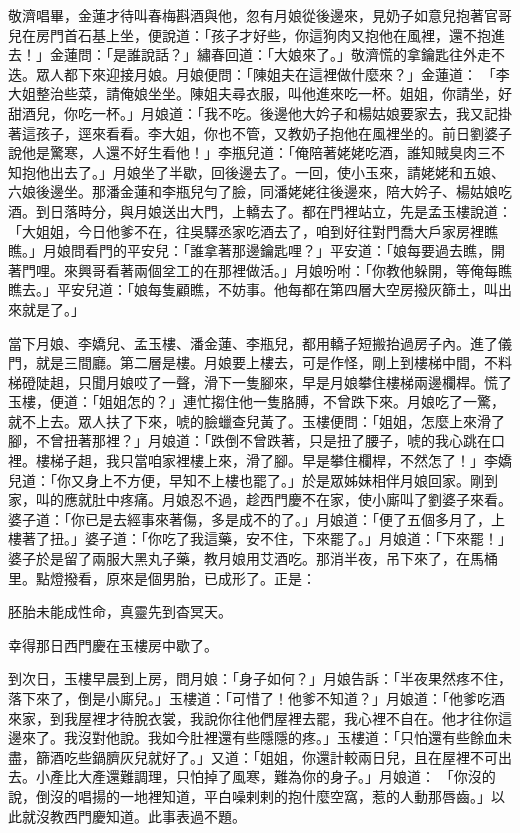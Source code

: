 \begin{showcontents}{}
敬濟唱畢，金蓮才待叫春梅斟酒與他，忽有月娘從後邊來，見奶子如意兒抱著官哥兒在房門首石基上坐，便說道：「孩子才好些，你這狗肉又抱他在風裡，還不抱進去！」金蓮問：「是誰說話？」繡春回道：「大娘來了。」敬濟慌的拿鑰匙往外走不迭。眾人都下來迎接月娘。月娘便問：「陳姐夫在這裡做什麼來？」金蓮道： 「李大姐整治些菜，請俺娘坐坐。陳姐夫尋衣服，叫他進來吃一杯。姐姐，你請坐，好甜酒兒，你吃一杯。」月娘道：「我不吃。後邊他大妗子和楊姑娘要家去，我又記掛著這孩子，逕來看看。李大姐，你也不管，又教奶子抱他在風裡坐的。前日劉婆子說他是驚寒，人還不好生看他！」李瓶兒道：「俺陪著姥姥吃酒，誰知賊臭肉三不知抱他出去了。」月娘坐了半歇，回後邊去了。一回，使小玉來，請姥姥和五娘、六娘後邊坐。那潘金蓮和李瓶兒勻了臉，同潘姥姥往後邊來，陪大妗子、楊姑娘吃酒。到日落時分，與月娘送出大門，上轎去了。都在門裡站立，先是孟玉樓說道：「大姐姐，今日他爹不在，往吳驛丞家吃酒去了，咱到好往對門喬大戶家房裡瞧瞧。」月娘問看門的平安兒：「誰拿著那邊鑰匙哩？」平安道：「娘每要過去瞧，開著門哩。來興哥看著兩個坌工的在那裡做活。」月娘吩咐：「你教他躲開，等俺每瞧瞧去。」平安兒道：「娘每隻顧瞧，不妨事。他每都在第四層大空房撥灰篩土，叫出來就是了。」

當下月娘、李嬌兒、孟玉樓、潘金蓮、李瓶兒，都用轎子短搬抬過房子內。進了儀門，就是三間廳。第二層是樓。月娘要上樓去，可是作怪，剛上到樓梯中間，不料梯磴陡趄，只聞月娘哎了一聲，滑下一隻腳來，早是月娘攀住樓梯兩邊欄桿。慌了玉樓，便道：「姐姐怎的？」連忙搊住他一隻胳膊，不曾跌下來。月娘吃了一驚，就不上去。眾人扶了下來，唬的臉蠟查兒黃了。玉樓便問：「姐姐，怎麼上來滑了腳，不曾扭著那裡？」月娘道：「跌倒不曾跌著，只是扭了腰子，唬的我心跳在口裡。樓梯子趄，我只當咱家裡樓上來，滑了腳。早是攀住欄桿，不然怎了！」李嬌兒道：「你又身上不方便，早知不上樓也罷了。」於是眾姊妹相伴月娘回家。剛到家，叫的應就肚中疼痛。月娘忍不過，趁西門慶不在家，使小廝叫了劉婆子來看。婆子道：「你已是去經事來著傷，多是成不的了。」月娘道：「便了五個多月了，上樓著了扭。」婆子道：「你吃了我這藥，安不住，下來罷了。」月娘道：「下來罷！」婆子於是留了兩服大黑丸子藥，教月娘用艾酒吃。那消半夜，吊下來了，在馬桶里。點燈撥看，原來是個男胎，已成形了。正是：

胚胎未能成性命，真靈先到杳冥天。

幸得那日西門慶在玉樓房中歇了。

到次日，玉樓早晨到上房，問月娘：「身子如何？」月娘告訴：「半夜果然疼不住，落下來了，倒是小廝兒。」玉樓道：「可惜了！他爹不知道？」月娘道：「他爹吃酒來家，到我屋裡才待脫衣裳，我說你往他們屋裡去罷，我心裡不自在。他才往你這邊來了。我沒對他說。我如今肚裡還有些隱隱的疼。」玉樓道：「只怕還有些餘血未盡，篩酒吃些鍋臍灰兒就好了。」又道：「姐姐，你還計較兩日兒，且在屋裡不可出去。小產比大產還難調理，只怕掉了風寒，難為你的身子。」月娘道： 「你沒的說，倒沒的唱揚的一地裡知道，平白噪剌剌的抱什麼空窩，惹的人動那唇齒。」以此就沒教西門慶知道。此事表過不題。


\end{showcontents}
